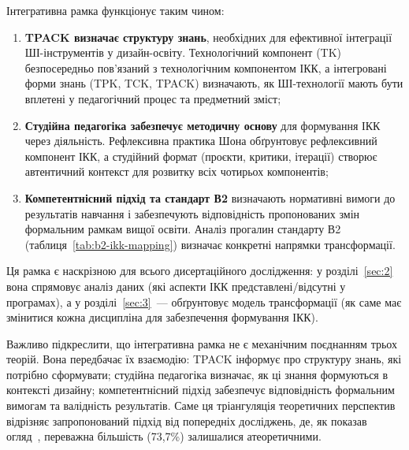 Інтегративна рамка функціонує таким чином:

\begin{enumerate}
    \item \textbf{TPACK визначає структуру знань}, необхідних для ефективної інтеграції ШІ-інструментів у дизайн-освіту. Технологічний компонент (TK) безпосередньо пов'язаний з технологічним компонентом ІКК, а інтегровані форми знань (TPK, TCK, TPACK) визначають, як ШІ-технології мають бути вплетені у педагогічний процес та предметний зміст;

    \item \textbf{Студійна педагогіка забезпечує методичну основу} для формування ІКК через діяльність. Рефлексивна практика Шона обґрунтовує рефлексивний компонент ІКК, а студійний формат (проєкти, критики, ітерації) створює автентичний контекст для розвитку всіх чотирьох компонентів;

    \item \textbf{Компетентнісний підхід та стандарт В2} визначають нормативні вимоги до результатів навчання і забезпечують відповідність пропонованих змін формальним рамкам вищої освіти. Аналіз прогалин стандарту В2 (таблиця~\ref{tab:b2-ikk-mapping}) визначає конкретні напрямки трансформації.
\end{enumerate}

Ця рамка є наскрізною для всього дисертаційного дослідження: у розділі~\ref{sec:2} вона спрямовує аналіз даних (які аспекти ІКК представлені/відсутні у програмах), а у розділі~\ref{sec:3}~--- обґрунтовує модель трансформації (як саме має змінитися кожна дисципліна для забезпечення формування ІКК).

Важливо підкреслити, що інтегративна рамка не є механічним поєднанням трьох теорій. Вона передбачає їх взаємодію: TPACK інформує про структуру знань, які потрібно сформувати; студійна педагогіка визначає, як ці знання формуються в контексті дизайну; компетентнісний підхід забезпечує відповідність формальним вимогам та валідність результатів. Саме ця тріангуляція теоретичних перспектив відрізняє запропонований підхід від попередніх досліджень, де, як показав огляд~\cite{Musiienko2026ScopingReview}, переважна більшість (73,7\%) залишалися атеоретичними.
